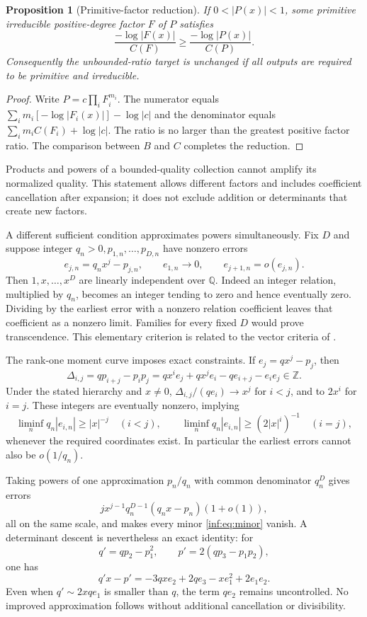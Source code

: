 \documentclass[11pt,a4paper]{article}
\newcommand{\Q}{\mathbb Q}
\newcommand{\Z}{\mathbb Z}
\newtheorem{proposition}[theorem]{Proposition}
\theoremstyle{definition}
\theoremstyle{remark}
\numberwithin{equation}{section}
\begin{document}
\begin{proposition}[Primitive-factor reduction]\label{inf:prop:factor}
If $0<|P(x)|<1$, some primitive irreducible positive-degree factor $F$ of $P$ satisfies
\[
 \frac{-\log|F(x)|}{C(F)}\ge\frac{-\log|P(x)|}{C(P)}.
\]
Consequently the unbounded-ratio target is unchanged if all outputs are required to be primitive and irreducible.
\end{proposition}
\begin{proof}
Write $P=c\prod_iF_i^{m_i}$. The numerator equals $\sum_im_i[-\log|F_i(x)|]-\log|c|$ and the denominator equals $\sum_im_iC(F_i)+\log|c|$. The ratio is no larger than the greatest positive factor ratio. The comparison between $B$ and $C$ completes the reduction.
\end{proof}
Products and powers of a bounded-quality collection cannot amplify its normalized quality. This statement allows different factors and includes coefficient cancellation after expansion; it does not exclude addition or determinants that create new factors.

A different sufficient condition approximates powers simultaneously. Fix $D$ and suppose integer $q_n>0,p_{1,n},\ldots,p_{D,n}$ have nonzero errors
\[
 e_{j,n}=q_nx^j-p_{j,n},\qquad e_{1,n}\to0,\qquad e_{j+1,n}=o(e_{j,n}).
\]
Then $1,x,\ldots,x^D$ are linearly independent over $\Q$. Indeed an integer relation, multiplied by $q_n$, becomes an integer tending to zero and hence eventually zero. Dividing by the earliest error with a nonzero relation coefficient leaves that coefficient as a nonzero limit. Families for every fixed $D$ would prove transcendence. This elementary criterion is related to the vector criteria of \cite{inf:FischlerVectors}.

The rank-one moment curve imposes exact constraints. If $e_j=qx^j-p_j$, then
\begin{equation}\label{inf:eq:minor}
 \Delta_{i,j}=qp_{i+j}-p_ip_j
 =qx^ie_j+qx^je_i-qe_{i+j}-e_ie_j\in\Z.
\end{equation}
Under the stated hierarchy and $x\ne0$, $\Delta_{i,j}/(qe_i)\to x^j$ for $i<j$, and to $2x^i$ for $i=j$. These integers are eventually nonzero, implying
\[
 \liminf_nq_n|e_{i,n}|\ge|x|^{-j}\quad(i<j),\qquad
 \liminf_nq_n|e_{i,n}|\ge(2|x|^i)^{-1}\quad(i=j),
\]
whenever the required coordinates exist. In particular the earliest errors cannot also be $o(1/q_n)$.

Taking powers of one approximation $p_n/q_n$ with common denominator $q_n^D$ gives errors
\[
 jx^{j-1}q_n^{D-1}(q_nx-p_n)(1+o(1)),
\]
all on the same scale, and makes every minor \eqref{inf:eq:minor} vanish. A determinant descent is nevertheless an exact identity: for
\[
 q'=qp_2-p_1^2,\qquad p'=2(qp_3-p_1p_2),
\]
one has
\[
 q'x-p'=-3qxe_2+2qe_3-xe_1^2+2e_1e_2.
\]
Even when $q'\sim2xqe_1$ is smaller than $q$, the term $qe_2$ remains uncontrolled. No improved approximation follows without additional cancellation or divisibility.
\end{document}
